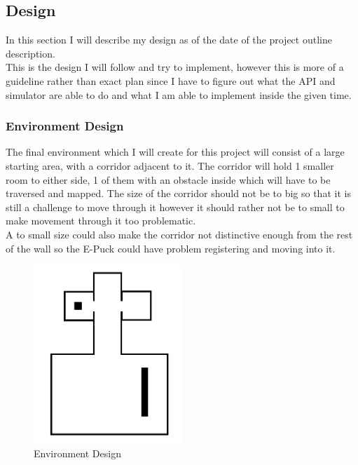 \documentclass[10pt,a4paper]{article}
\begin{document}
\begin{flushleft}
\subsection{Design}
In this section I will describe my design as of the date of the project outline description. \\
This is the design I will follow and try to implement, however this is more of a guideline rather than exact plan since I have to figure out what the API and simulator are able to do and what I am able to implement inside the given time.\\

\subsubsection{Environment Design}
The final environment which I will create for this project will consist of a large starting area, with a corridor adjacent to it. The corridor will hold 1 smaller room to either side, 1 of them with an obstacle inside which will have to be traversed and mapped. The size of the corridor should not be to big so that it is still a challenge to move through it however it should rather not be to small to make movement through it too problematic. \\
A to small size could also make the corridor not distinctive enough from the rest of the wall so the E-Puck could have problem registering and moving into it.\\

\begin{figure}[h]
\centering
\includegraphics[width=0.5\textwidth]{figures/environment_example.png} 
\caption{Environment Design}
\label{Picture 2}
\end{figure}


\end{flushleft}
\end{document}
